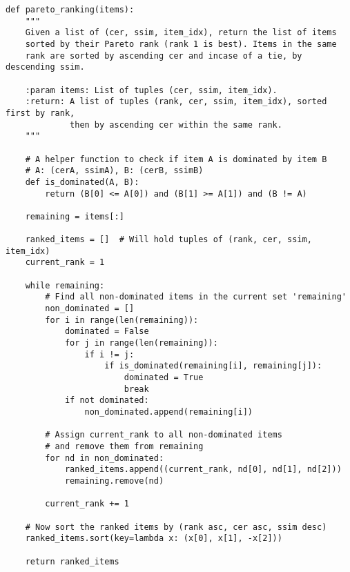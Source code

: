 \begin{lstlisting}[style=mypython, caption=Pareto Optimal Ranking of generated outputs for a given text-context pair using CER and SSIM metrics]
def pareto_ranking(items):
    """
    Given a list of (cer, ssim, item_idx), return the list of items
    sorted by their Pareto rank (rank 1 is best). Items in the same
    rank are sorted by ascending cer and incase of a tie, by descending ssim.
    
    :param items: List of tuples (cer, ssim, item_idx).
    :return: A list of tuples (rank, cer, ssim, item_idx), sorted first by rank,
             then by ascending cer within the same rank.
    """
    
    # A helper function to check if item A is dominated by item B
    # A: (cerA, ssimA), B: (cerB, ssimB)
    def is_dominated(A, B):
        return (B[0] <= A[0]) and (B[1] >= A[1]) and (B != A)
    
    remaining = items[:]
    
    ranked_items = []  # Will hold tuples of (rank, cer, ssim, item_idx)
    current_rank = 1
    
    while remaining:
        # Find all non-dominated items in the current set 'remaining'
        non_dominated = []
        for i in range(len(remaining)):
            dominated = False
            for j in range(len(remaining)):
                if i != j:
                    if is_dominated(remaining[i], remaining[j]):
                        dominated = True
                        break
            if not dominated:
                non_dominated.append(remaining[i])
        
        # Assign current_rank to all non-dominated items
        # and remove them from remaining
        for nd in non_dominated:
            ranked_items.append((current_rank, nd[0], nd[1], nd[2]))
            remaining.remove(nd)
        
        current_rank += 1
    
    # Now sort the ranked items by (rank asc, cer asc, ssim desc)
    ranked_items.sort(key=lambda x: (x[0], x[1], -x[2]))
    
    return ranked_items
\end{lstlisting}


